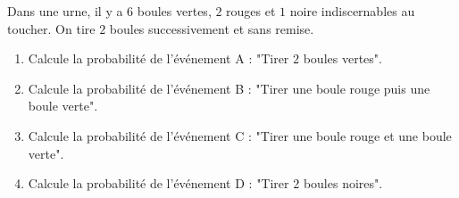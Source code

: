 \begin{pageParcourst}

\begin{minipage}{.5\linewidth}
Dans une urne, il y a $6$ boules vertes, $2$ rouges et $1$ noire indiscernables au toucher. On tire $2$ boules successivement et sans remise.
\end{minipage}
\begin{minipage}{.5\linewidth}
\vspace{3cm}
\end{minipage}
\begin{enumerate}[leftmargin=*]
\item Calcule la probabilité de l'événement A : "Tirer $2$ boules vertes". 
\item Calcule la probabilité de l'événement B : "Tirer une boule rouge puis une boule verte". 
\item Calcule la probabilité de l'événement C : "Tirer une boule rouge et une boule verte". 
\item Calcule la probabilité de l'événement D : "Tirer $2$ boules noires". 
\end{enumerate}



\end{pageParcourst}
